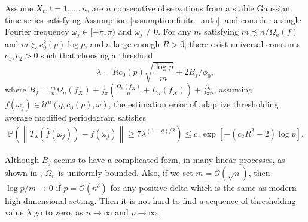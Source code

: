 \begin{prop}
\label{prop: gauss_prop}
Assume ${X}_t, t=1,\ldots,n$, are $n$ consecutive observations from a stable Gaussian time series satisfying Assumption \ref{assumption:finite_auto}, and consider a single Fourier frequency $\omega_j \in [-\pi, \pi)$ and $\omega_j \neq 0$. 
For any $m $ satisfying $m \precsim n/ \Omega_n(f)$ and $m \succsim c_0^2(p)\log p$, and a large enough $R > 0$,  
there exist universal constants $c_1, c_2 > 0$ such that choosing a threshold 
\begin{equation}
\label{eq:threshold_value}
\lambda = R c_0(p)\sqrt{\frac{\log p}{m}} +2B_f/\phi_0, 
\end{equation}
where $B_f = \frac{m}{n}\Omega_n(f_X) + \frac{1}{2\pi}\left(\frac{\Omega_n(f_X)}{n}+L_n(f_X)\right) +\frac{\Omega_n}{2\pi n}$, 
assuming $f(\omega_j)\in \mathcal{U}^a(q, c_0(p), \omega)$, 
the estimation error of adaptive thresholding average modified periodogram satisfies 
\begin{equation}
\begin{aligned}
\mathbb{P}\left(\left\|T_{\lambda}(\hat{f}(\omega_j)) - f(\omega_j)\right\|\ge 7 \lambda^{(1-q)/2} \right)
\le c_1 \exp\left[-(c_2 R^2-2)\log p\right]. \nonumber
\end{aligned}
\end{equation}
\end{prop}

\begin{remark}
Although $B_f$ seems to have a complicated form,  in many linear processes,  as shown in \cite{sun2018large},  $\Omega_n$ is uniformly bounded. Also, if we set $m=\mathcal{O}(\sqrt{n})$, then $\log p/m \rightarrow 0$ if $p = \mathcal{O}(n^\delta)$ for any positive delta which is the same as modern high dimensional setting. Then it is not hard to find a sequence of thresholding value $\lambda$ go to zero, as $n\rightarrow \infty$ and $p\rightarrow \infty$, 
\end{remark}











